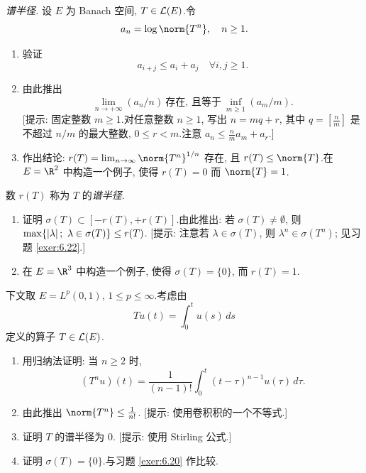 \begin{exercise}
\label{exer:6.23}
\emph{谱半径.}
设 $E$ 为 Banach 空间, $T\in\mathcal{L}(E)$.令
\begin{equation*}
a_n=\log\norm{T^n},\quad n\ge1.
\end{equation*}
\begin{enumerate}[label=\arabic*., leftmargin=2.2em, itemsep=0.3em]
	\item 验证
	      \begin{equation*}
	      a_{i+j}\le a_i+a_j\quad\forall i,j\ge1.
	      \end{equation*}
	\item 由此推出
	      \begin{equation*}
	      \lim_{n\to+\infty}(a_n/n)\ \text{存在, 且等于}\ \inf_{m\ge1}(a_m/m).
	      \end{equation*}
	      [提示: 固定整数 $m\ge1$.对任意整数 $n\ge1$, 写出
	      $n=mq+r$, 其中 $q=[\frac nm]$ 是不超过 $n/m$ 的最大整数,
	      $0\le r<m$.注意 $a_n\le\frac nm a_m+a_r$.]
	\item 作出结论: $r(T)=\lim_{n\to\infty}\norm{T^n}^{1/n}$ 存在, 且
	      $r(T)\le\norm{T}$.在 $E=\R^2$ 中构造一个例子, 使得 $r(T)=0$
	      而 $\norm{T}=1$.
\end{enumerate}

数 $r(T)$ 称为 $T$ 的\emph{谱半径}.

\begin{enumerate}[label=\arabic*., leftmargin=2.2em, start=4, itemsep=0.3em]
	\item 证明 $\sigma(T)\subset[-r(T),+r(T)]$.由此推出: 若
	      $\sigma(T)\ne\emptyset$, 则
	      $\max\{\abs{\lambda};\ \lambda\in\sigma(T)\}\le r(T)$.
	      [提示: 注意若 $\lambda\in\sigma(T)$, 则
	      $\lambda^n\in\sigma(T^n)$; 见习题  \ref{exer:6.22}.]
	\item 在 $E=\R^3$ 中构造一个例子, 使得 $\sigma(T)=\{0\}$, 而
	      $r(T)=1$.
\end{enumerate}

下文取 $E=L^p(0,1)$, $1\le p\le\infty$.考虑由
\begin{equation*}
Tu(t)=\int_0^tu(s)\,ds
\end{equation*}
定义的算子 $T\in\mathcal{L}(E)$.

\begin{enumerate}[label=\arabic*., leftmargin=2.2em, start=6, itemsep=0.3em]
	\item 用归纳法证明: 当 $n\ge2$ 时,
	      \begin{equation*}
	      (T^nu)(t)=\frac{1}{(n-1)!}\int_0^t(t-\tau)^{n-1}u(\tau)\,d\tau.
	      \end{equation*}
	\item 由此推出 $\norm{T^n}\le\frac{1}{n!}$.
	      [提示: 使用卷积积的一个不等式.]
	\item 证明 $T$ 的谱半径为 $0$.
	      [提示: 使用 Stirling 公式.]
	\item 证明 $\sigma(T)=\{0\}$.与习题  \ref{exer:6.20} 作比较.
\end{enumerate}
\end{exercise}

